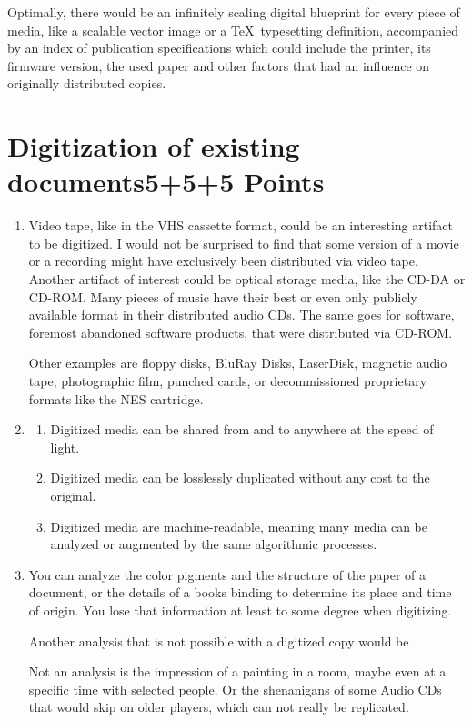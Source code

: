 \documentclass[10pt,a4paper]{article}
\begin{document}
\begin{enumerate}
    Optimally, there would be an infinitely scaling digital blueprint for every piece of media, like a scalable vector image or a \TeX\ typesetting definition, accompanied by an index of publication specifications which could include the printer, its firmware version, the used paper and other factors that had an influence on originally distributed copies.
\end{enumerate}



\section{\hfill Digitization of existing documents\hfill 5+5+5 Points}
\begin{enumerate}
    \item Video tape, like in the VHS cassette format, could be an interesting artifact to be digitized. I would not be surprised to find that some version of a movie or a recording might have exclusively been distributed via video tape.\\
    Another artifact of interest could be optical storage media, like the CD-DA or CD-ROM. Many pieces of music have their best or even only publicly available format in their distributed audio CDs. The same goes for software, foremost abandoned software products, that were distributed via CD-ROM.
    
    Other examples are floppy disks, BluRay Disks, LaserDisk, magnetic audio tape, photographic film, punched cards, or decommissioned proprietary formats like the NES cartridge.
    
    \item \begin{enumerate}
        \item Digitized media can be shared from and to anywhere at the speed of light.
        \item Digitized media can be losslessly duplicated without any cost to the original.
        \item Digitized media are machine-readable, meaning many media can be analyzed or augmented by the same algorithmic processes.
    \end{enumerate}
    
    \item You can analyze the color pigments and the structure of the paper of a document, or the details of a books binding to determine its place and time of origin. You lose that information at least to some degree when digitizing.
    
    Another analysis that is not possible with a digitized copy would be
    
    Not an analysis is the impression of a painting in a room, maybe even at a specific time with selected people. Or the shenanigans of some Audio CDs that would skip on older players, which can not really be replicated.
\end{enumerate}
\end{document}
